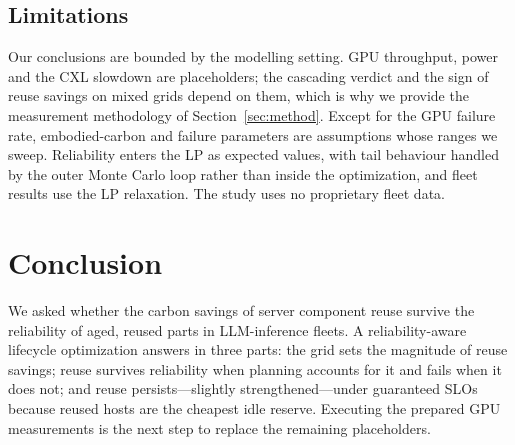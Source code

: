 \documentclass[11pt]{article}
\begin{document}
\subsection{Limitations}
Our conclusions are bounded by the modelling setting. GPU throughput, power and the CXL slowdown are placeholders; the cascading verdict and the sign of reuse savings on mixed grids depend on them, which is why we provide the measurement methodology of Section~\ref{sec:method}. Except for the GPU failure rate, embodied-carbon and failure parameters are assumptions whose ranges we sweep. Reliability enters the LP as expected values, with tail behaviour handled by the outer Monte Carlo loop rather than inside the optimization, and fleet results use the LP relaxation. The study uses no proprietary fleet data.

\section{Conclusion}
\label{sec:conclusion}
We asked whether the carbon savings of server component reuse survive the reliability of aged, reused parts in LLM-inference fleets. A reliability-aware lifecycle optimization answers in three parts: the grid sets the magnitude of reuse savings; reuse survives reliability when planning accounts for it and fails when it does not; and reuse persists---slightly strengthened---under guaranteed SLOs because reused hosts are the cheapest idle reserve. Executing the prepared GPU measurements is the next step to replace the remaining placeholders.


\end{document}
